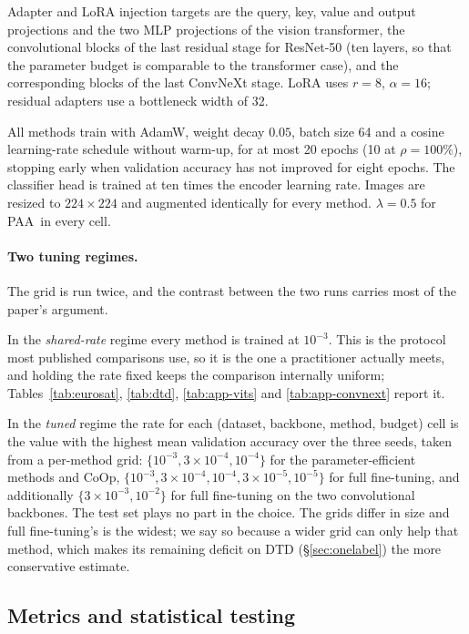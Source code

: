 \documentclass[preprint,12pt]{elsarticle}
\newcommand{\ours}{\textsc{PAA}}
\begin{document}
Adapter and LoRA injection targets are the query, key, value and output
projections and the two MLP projections of the vision transformer, the
convolutional blocks of the last residual stage for ResNet-50 (ten layers, so
that the parameter budget is comparable to the transformer case), and the
corresponding blocks of the last ConvNeXt stage. LoRA uses $r=8$, $\alpha=16$;
residual adapters use a bottleneck width of 32.

All methods train with AdamW, weight decay $0.05$, batch size 64 and a cosine
learning-rate schedule without warm-up, for at most 20 epochs (10 at
$\rho=100\%$), stopping early when validation accuracy has not improved for eight
epochs. The classifier head is trained at ten times the encoder learning rate.
Images are resized to $224\times224$ and augmented identically for every method.
$\lambda=0.5$ for \ours\ in every cell.

\paragraph{Two tuning regimes.} The grid is run twice, and the contrast between
the two runs carries most of the paper's argument.

In the \emph{shared-rate} regime every method is trained at $10^{-3}$. This is the
protocol most published comparisons use, so it is the one a practitioner actually
meets, and holding the rate fixed keeps the comparison internally uniform;
Tables~\ref{tab:eurosat}, \ref{tab:dtd}, \ref{tab:app-vits} and
\ref{tab:app-convnext} report it.

In the \emph{tuned} regime the rate for each (dataset, backbone, method, budget)
cell is the value with the highest mean validation accuracy over the three seeds,
taken from a per-method grid: $\{10^{-3}, 3\times10^{-4}, 10^{-4}\}$ for the
parameter-efficient methods and CoOp, $\{10^{-3}, 3\times10^{-4}, 10^{-4},
3\times10^{-5}, 10^{-5}\}$ for full fine-tuning, and additionally $\{3\times
10^{-3}, 10^{-2}\}$ for full fine-tuning on the two convolutional backbones. The
test set plays no part in the choice. The grids differ in size and full
fine-tuning's is the widest; we say so because a wider grid can only help that
method, which makes its remaining deficit on DTD (\S\ref{sec:onelabel}) the more
conservative estimate.

\subsection{Metrics and statistical testing}
\label{sec:metrics}
\end{document}
